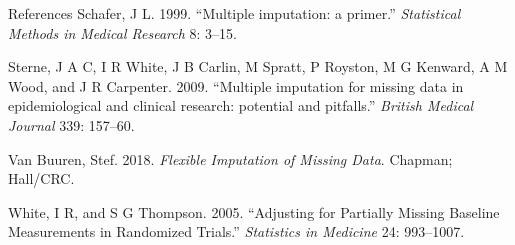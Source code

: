 \documentclass[ignorenonframetext,]{beamer}
\begin{document}
\begin{frame}[allowframebreaks]{References}
\leavevmode\hypertarget{ref-Schafer:1999}{}%
Schafer, J L. 1999. ``Multiple imputation: a primer.'' \emph{Statistical
Methods in Medical Research} 8: 3--15.

\leavevmode\hypertarget{ref-Sterneux2fWhiteux2fCarlin:2009}{}%
Sterne, J A C, I R White, J B Carlin, M Spratt, P Royston, M G Kenward,
A M Wood, and J R Carpenter. 2009. ``Multiple imputation for missing
data in epidemiological and clinical research: potential and pitfalls.''
\emph{British Medical Journal} 339: 157--60.

\leavevmode\hypertarget{ref-van2018flexible}{}%
Van Buuren, Stef. 2018. \emph{Flexible Imputation of Missing Data}.
Chapman; Hall/CRC.

\leavevmode\hypertarget{ref-Whiteux2fThompson:2005}{}%
White, I R, and S G Thompson. 2005. ``Adjusting for Partially Missing
Baseline Measurements in Randomized Trials.'' \emph{Statistics in
Medicine} 24: 993--1007.

\end{frame}
\end{document}
